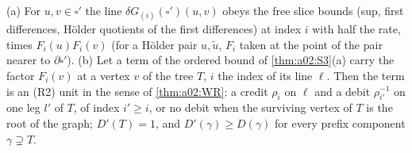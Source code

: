 \begin{lemma}\label{lem:a02:FACE}
\textup{(a)} For $u,v\in\square'$ the line $\delta G_{(i)}(\square')(u,v)$ obeys the free slice bounds \cite[(3.63)--(3.65)]{K1} (sup, first differences, H\"older quotients of the first differences) at index $i$ with half the rate, times $F_i(u)F_i(v)$ (for a H\"older pair $u,\tilde u$, $F_i$ taken at the point of the pair nearer to $\partial\square'$). \textup{(b)} Let a term of the ordered bound of \cref{thm:a02:S3}(a) carry the factor $F_i(v)$ at a vertex $v$ of the tree $T$, $i$ the index of its line $\ell$. Then the term is an \textup{(R2)} unit in the sense of \cref{thm:a02:WR}: a credit $\rho_i$ on $\ell$ and a debit $\rho_{i'}^{-1}$ on one leg $l'$ of $T$, of index $i'\ge i$, or no debit when the surviving vertex of $T$ is the root of the graph; $D'(T)=1$, and $D'(\gamma)\ge D(\gamma)$ for every prefix component $\gamma\supsetneq T$.
\end{lemma}
